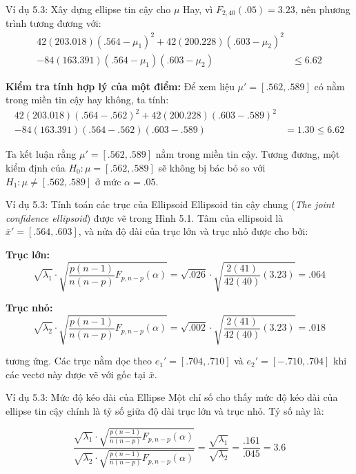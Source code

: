 \begin{frame}{Ví dụ 5.3: Xây dựng ellipse tin cậy cho $\mu$}
    Hay, vì $F_{2, 40}(.05) = 3.23$, nên phương trình tương đương với:
    \begin{align*}
        42(203.018)(.564 - \mu_1)^2 + 42(200.228)(.603 - \mu_2)^2 & \\
        - 84(163.391)(.564 - \mu_1)(.603 - \mu_2) &\le 6.62
    \end{align*}
    
    \textbf{Kiểm tra tính hợp lý của một điểm:}
    Để xem liệu $\mu' = [.562, .589]$ có nằm trong miền tin cậy hay không, ta tính:
    \begin{align*}
        42(203.018)(.564 - .562)^2 + 42(200.228)(.603 - .589)^2 & \\
        - 84(163.391)(.564 - .562)(.603 - .589) &= 1.30 \le 6.62
    \end{align*}
    
    Ta kết luận rằng $\mu' = [.562, .589]$ nằm trong miền tin cậy. Tương đương, một kiểm định của $H_0: \mu = [.562, .589]$ sẽ không bị bác bỏ so với $H_1: \mu \ne [.562, .589]$ ở mức $\alpha = .05$.
\end{frame}

\begin{frame}{Ví dụ 5.3: Tính toán các trục của Ellipsoid}
    Ellipsoid tin cậy chung (\textit{The joint confidence ellipsoid}) được vẽ trong Hình 5.1. Tâm của ellipsoid là $\bar{x}' = [.564, .603]$, và nửa độ dài của trục lớn và trục nhỏ được cho bởi:
    
    \textbf{Trục lớn:}
    \vspace{-0.2cm} %
    \[
        \sqrt{\lambda_1} \cdot \sqrt{\frac{p(n - 1)}{n(n - p)} F_{p, n-p}(\alpha)} = \sqrt{.026} \cdot \sqrt{\frac{2(41)}{42(40)} (3.23)} = .064
    \]
    
    \textbf{Trục nhỏ:}
    \vspace{-0.2cm} %
    \[
        \sqrt{\lambda_2} \cdot \sqrt{\frac{p(n - 1)}{n(n - p)} F_{p, n-p}(\alpha)} = \sqrt{.002} \cdot \sqrt{\frac{2(41)}{42(40)} (3.23)} = .018
    \]
    
    \vspace{-0.2cm} %
    tương ứng. Các trục nằm dọc theo $e_1' = [.704, .710]$ và $e_2' = [-.710, .704]$ khi các vectơ này được vẽ với gốc tại $\bar{x}$. 
\end{frame}

\begin{frame}{Ví dụ 5.3: Mức độ kéo dài của Ellipse}
    Một chỉ số cho thấy mức độ kéo dài của ellipse tin cậy chính là tỷ số giữa độ dài trục lớn và trục nhỏ. Tỷ số này là:
    
    \[
        \frac{\sqrt{\lambda_1} \cdot \sqrt{\frac{p(n - 1)}{n(n - p)} F_{p, n-p}(\alpha)}}{\sqrt{\lambda_2} \cdot \sqrt{\frac{p(n - 1)}{n(n - p)} F_{p, n-p}(\alpha)}} = \frac{\sqrt{\lambda_1}}{\sqrt{\lambda_2}} = \frac{.161}{.045} = 3.6
    \]
\end{frame}

